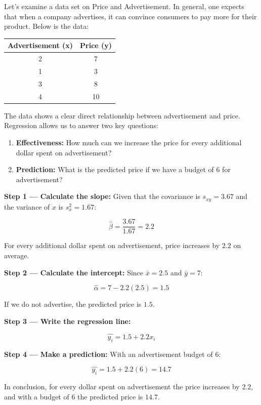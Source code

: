 \documentclass[
  11pt,
  letterpaper,
  DIV=11,
  numbers=noendperiod,
  oneside,
  open=any]{scrreprt}
\providecommand{\tightlist}{%
  \setlength{\itemsep}{0pt}\setlength{\parskip}{0pt}}\usepackage{longtable,booktabs,array}
\begin{document}
\begin{bsexample}[Example]

Let's examine a data set on Price and Advertisement. In general, one
expects that when a company advertises, it can convince consumers to pay
more for their product. Below is the data:

\begin{center}
\begin{tabular}{cc}
\toprule
Advertisement (x) & Price (y) \\
\midrule
2 & 7 \\
1 & 3 \\
3 & 8 \\
4 & 10 \\
\bottomrule
\end{tabular}
\end{center}

The data shows a clear direct relationship between advertisement and
price. Regression allows us to answer two key questions:

\begin{enumerate}
\def\labelenumi{\arabic{enumi}.}
\tightlist
\item
  \textbf{Effectiveness:} How much can we increase the price for every
  additional dollar spent on advertisement?
\item
  \textbf{Prediction:} What is the predicted price if we have a budget
  of \(6\) for advertisement?
\end{enumerate}

\textbf{Step 1 --- Calculate the slope:} Given that the covariance is
\(s_{xy}=3.67\) and the variance of \(x\) is \(s_x^2=1.67\):

\[\hat{\beta}= \frac{3.67}{1.67}=2.2\]

For every additional dollar spent on advertisement, price increases by
\(2.2\) on average.

\textbf{Step 2 --- Calculate the intercept:} Since \(\bar{x}=2.5\) and
\(\bar{y}=7\):

\[\hat{\alpha}=7-2.2(2.5)=1.5\]

If we do not advertise, the predicted price is \(1.5\).

\textbf{Step 3 --- Write the regression line:}

\[\hat{y_i}=1.5+2.2x_i\]

\textbf{Step 4 --- Make a prediction:} With an advertisement budget of
\(6\):

\[\hat{y_i}=1.5+2.2(6)=14.7\]

In conclusion, for every dollar spent on advertisement the price
increases by \(2.2\), and with a budget of \(6\) the predicted price is
\(14.7\).

\end{bsexample}
\end{document}
